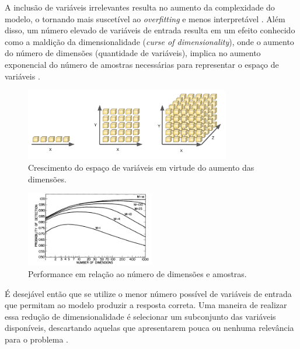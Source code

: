 A inclusão de variáveis irrelevantes resulta no aumento da complexidade do modelo, o tornando mais suscetível ao \textit{overfitting} e menos interpretável \cite[p. 204]{intro_stat_learn}. Além disso, um número elevado de variáveis de entrada resulta em um efeito conhecido como a maldição da dimensionalidade (\textit{curse of dimensionality}), onde o aumento do número de dimensões (quantidade de variáveis), implica no aumento exponencial do número de amostras necessárias para representar o espaço de variáveis \cite[p. 34]{bishop_2006}.

\begin{figure}[!htb]
    \caption{Crescimento do espaço de variáveis em virtude do aumento das dimensões.}
    \begin{center}    
    \includegraphics[width=0.8\textwidth]{imgs/rev/dimensionalty_grown.png}
    \end{center}
    \label{fig:dim_grown}
\end{figure}

\begin{figure}[!htb]
    \caption{Performance em relação ao número de dimensões e amostras.}
    \begin{center}  
    \includegraphics[width=0.5\textwidth]{imgs/rev/dim_performance}
    \end{center}
    \label{fig:dim_perf}
\end{figure}

É desejável então que se utilize o menor número possível de variáveis de entrada que permitam ao modelo produzir a resposta correta. Uma maneira de realizar essa redução de dimensionalidade é selecionar um subconjunto das variáveis disponíveis, descartando aquelas que apresentarem pouca ou nenhuma relevância para o problema \cite[p. 204]{intro_stat_learn}.


